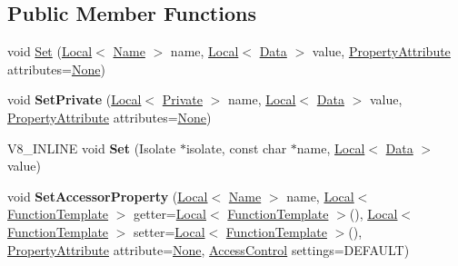 \subsection*{Public Member Functions}
\begin{DoxyCompactItemize}
\item 
void \mbox{\hyperlink{classv8_1_1Template_a623b9f0cdd87dc861516f276cc9a7cfa}{Set}} (\mbox{\hyperlink{classv8_1_1Local}{Local}}$<$ \mbox{\hyperlink{classv8_1_1Name}{Name}} $>$ name, \mbox{\hyperlink{classv8_1_1Local}{Local}}$<$ \mbox{\hyperlink{classv8_1_1Data}{Data}} $>$ value, \mbox{\hyperlink{namespacev8_a05f25f935e108a1ea2d150e274602b87}{Property\+Attribute}} attributes=\mbox{\hyperlink{namespacev8_a05f25f935e108a1ea2d150e274602b87a7ab4d58719c33b3ea2dfaefa29b111df}{None}})
\item 
\mbox{\label{classv8_1_1Template_a91214bdb0cc2d6534c81742e67fc4cc4}} 
void {\bfseries Set\+Private} (\mbox{\hyperlink{classv8_1_1Local}{Local}}$<$ \mbox{\hyperlink{classv8_1_1Private}{Private}} $>$ name, \mbox{\hyperlink{classv8_1_1Local}{Local}}$<$ \mbox{\hyperlink{classv8_1_1Data}{Data}} $>$ value, \mbox{\hyperlink{namespacev8_a05f25f935e108a1ea2d150e274602b87}{Property\+Attribute}} attributes=\mbox{\hyperlink{namespacev8_a05f25f935e108a1ea2d150e274602b87a7ab4d58719c33b3ea2dfaefa29b111df}{None}})
\item 
\mbox{\label{classv8_1_1Template_adc2fc88ac8df0d12b44d4c16ff0128cc}} 
V8\+\_\+\+I\+N\+L\+I\+NE void {\bfseries Set} (Isolate $\ast$isolate, const char $\ast$name, \mbox{\hyperlink{classv8_1_1Local}{Local}}$<$ \mbox{\hyperlink{classv8_1_1Data}{Data}} $>$ value)
\item 
\mbox{\label{classv8_1_1Template_a5c702a91581d6cf8cfb72c24ba8b8d17}} 
void {\bfseries Set\+Accessor\+Property} (\mbox{\hyperlink{classv8_1_1Local}{Local}}$<$ \mbox{\hyperlink{classv8_1_1Name}{Name}} $>$ name, \mbox{\hyperlink{classv8_1_1Local}{Local}}$<$ \mbox{\hyperlink{classv8_1_1FunctionTemplate}{Function\+Template}} $>$ getter=\mbox{\hyperlink{classv8_1_1Local}{Local}}$<$ \mbox{\hyperlink{classv8_1_1FunctionTemplate}{Function\+Template}} $>$(), \mbox{\hyperlink{classv8_1_1Local}{Local}}$<$ \mbox{\hyperlink{classv8_1_1FunctionTemplate}{Function\+Template}} $>$ setter=\mbox{\hyperlink{classv8_1_1Local}{Local}}$<$ \mbox{\hyperlink{classv8_1_1FunctionTemplate}{Function\+Template}} $>$(), \mbox{\hyperlink{namespacev8_a05f25f935e108a1ea2d150e274602b87}{Property\+Attribute}} attribute=\mbox{\hyperlink{namespacev8_a05f25f935e108a1ea2d150e274602b87a7ab4d58719c33b3ea2dfaefa29b111df}{None}}, \mbox{\hyperlink{namespacev8_a31d8355cb043d7d2dda3f4a52760b64e}{Access\+Control}} settings=D\+E\+F\+A\+U\+LT)

\end{DoxyCompactItemize}
